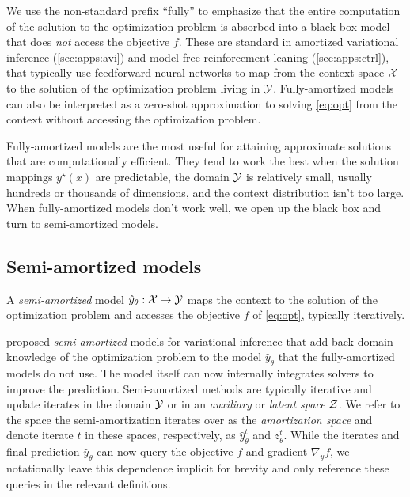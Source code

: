 \documentclass[twoside,11pt]{article}
\begin{document}
We use the non-standard prefix ``fully'' to emphasize
that the entire computation of the solution to the
optimization problem is absorbed into
a black-box model that does \emph{not} access the objective $f$.
These are standard in amortized variational inference
(\cref{sec:apps:avi}) and model-free reinforcement
leaning (\cref{sec:apps:ctrl}), that typically use
feedforward neural networks to map from
the context space ${\mathcal{X}}$ to the solution of the
optimization problem living in ${\mathcal{Y}}$.
Fully-amortized models can also be interpreted as a zero-shot
approximation to solving \cref{eq:opt} from the context
without accessing the optimization problem.

Fully-amortized models are the most useful for attaining approximate
solutions that are computationally efficient.
They tend to work the best when the
solution mappings $y^\star(x)$ are predictable,
the domain ${\mathcal{Y}}$ is relatively small,
usually hundreds or thousands of dimensions,
and the context distribution isn't too large.
When fully-amortized models don't work well, we open up the black
box and turn to semi-amortized models.

\subsection{Semi-amortized models}
\label{sec:model:semi}
\begin{definition}
  A \emph{semi-amortized} model $\hat y_\theta: {\mathcal{X}}\rightarrow{\mathcal{Y}}$
  maps the context to the solution of the optimization problem
  and accesses the objective $f$ of \cref{eq:opt},
  typically iteratively.
\end{definition}

\citet{kim2018semi,marino2018iterative}
proposed \emph{semi-amortized} models for variational inference
that add back domain knowledge of the optimization problem
to the model $\hat y_\theta$ that the fully-amortized
models do not use.
The model itself can now internally integrates
solvers to improve the prediction.
Semi-amortized methods are typically iterative and update
iterates in the domain ${\mathcal{Y}}$ or in an \emph{auxiliary}
or \emph{latent space} ${\mathcal{Z}}$.
We refer to the space the semi-amortization iterates over
as the \emph{amortization space} and denote iterate $t$
in these spaces, respectively, as $\hat y^{t}_\theta$ and $z^t_\theta$.
While the iterates and final prediction $\hat y_\theta$
can now query the objective $f$ and gradient $\nabla_y f$,
we notationally leave this dependence implicit for
brevity and only reference these queries in the relevant definitions.
\end{document}
